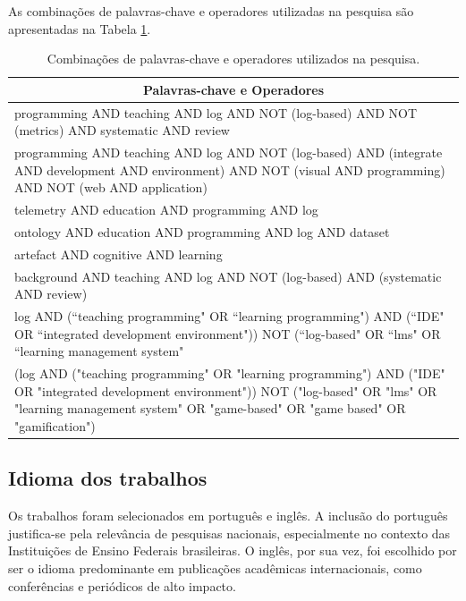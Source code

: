 As combinações de palavras-chave e operadores utilizadas na pesquisa são apresentadas na Tabela \ref{tab:keywords}.

\begin{table}[H]
\centering
\footnotesize
\begin{tabular}{|p{16cm}|}
\hline 
\multicolumn{1}{|c|}{\textbf{Palavras-chave e Operadores}} \\ 
\hline 
programming AND teaching AND log AND NOT (log-based) AND NOT (metrics) AND systematic AND review \\ 
\hline 
programming AND teaching AND log AND NOT (log-based) AND (integrate AND development AND environment) AND NOT (visual AND programming) AND NOT (web AND application) \\ 
\hline 
telemetry AND education AND programming AND log \\ 
\hline 
ontology AND education AND programming AND log AND dataset \\
\hline
artefact AND cognitive AND learning \\
\hline
background AND teaching AND log AND NOT (log-based) AND (systematic AND review) \\
\hline
log AND (``teaching programming" OR ``learning programming") AND (``IDE" OR ``integrated development environment")) NOT (``log-based" OR ``lms" OR ``learning management system" \\ 
\hline
(log AND ("teaching programming" OR "learning programming") AND ("IDE" OR "integrated development environment")) NOT ("log-based" OR "lms" OR "learning management system" OR "game-based" OR "game based" OR "gamification") \\ 
\hline
\end{tabular}
\caption{Combinações de palavras-chave e operadores utilizados na pesquisa.}
\label{tab:keywords}
\end{table}

\subsection{Idioma dos trabalhos}\label{subsec:idioma-trabalhos}

Os trabalhos foram selecionados em português e inglês. A inclusão do português justifica-se pela relevância de pesquisas nacionais, especialmente no contexto das Instituições de Ensino Federais brasileiras. O inglês, por sua vez, foi escolhido por ser o idioma predominante em publicações acadêmicas internacionais, como conferências e periódicos de alto impacto.

